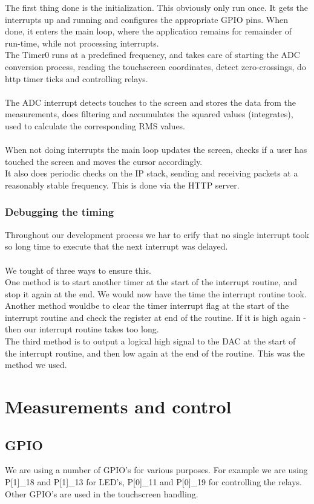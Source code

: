 The first thing done is the initialization. This obviously only run once. It gets the interrupts up and running and configures the appropriate GPIO pins. When done, it enters the main loop, where the application remains for remainder of run-time, while not processing interrupts.\\
The Timer0 runs at a predefined frequency, and takes care of starting the ADC conversion process, reading the touchscreen coordinates, detect zero-crossings, do http timer ticks and controlling relays.\\\\
The ADC interrupt detects touches to the screen and stores the data from the measurements, does filtering and accumulates the squared values (integrates), used to calculate the corresponding RMS values.\\\\
When not doing interrupts the main loop updates the screen, checks if a user has touched the screen and moves the cursor accordingly.\\
It also does periodic checks on the IP stack, sending and receiving packets at a reasonably stable frequency. This is done via the HTTP server.
\subsubsection{Debugging the timing}
Throughout our development process we har to erify that no single interrupt took so long time to execute that the next interrupt was delayed.\\\\
We tought of three ways to ensure this.\\
One method is to start another timer at the start of the interrupt routine, and stop it again at the end. We would now have the time the interrupt routine took.\\
Another method wouldbe to clear the timer interrupt flag at the start of the interrupt routine and check the register at end of the routine. If it is high again - then our interrupt routine takes too long.\\
The third method is to output a logical high signal to the DAC at the start of the interrupt routine, and then low again at the end of the routine. This was the method we used.

\section{Measurements and control}
\subsection{GPIO}
We are using a number of GPIO's for various purposes. For example we are using P[1]\_18 and P[1]\_13 for LED's, P[0]\_11 and P[0]\_19 for controlling the relays. Other GPIO's are used in the touchscreen handling.

